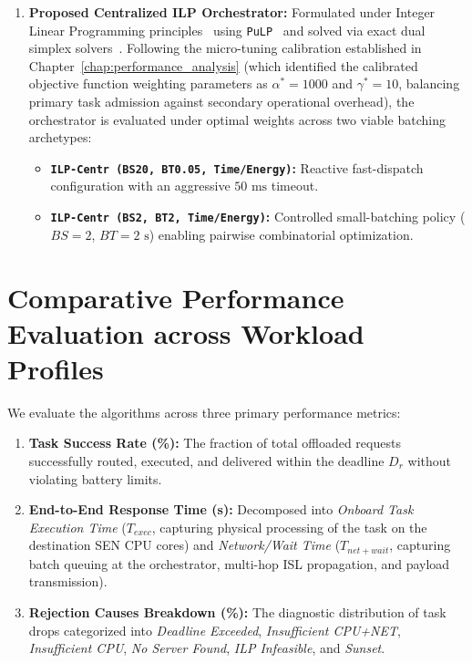 \begin{enumerate}
    \item \textbf{Proposed Centralized ILP Orchestrator:}
    Formulated under Integer Linear Programming principles~\cite{wolsey1998integer} using \texttt{PuLP}~\cite{pulp2011} and solved via exact dual simplex solvers~\cite{huangfu2018highs}. Following the micro-tuning calibration established in Chapter~\ref{chap:performance_analysis} (which identified the calibrated objective function weighting parameters as $\alpha^* = 1000$ and $\gamma^* = 10$, balancing primary task admission against secondary operational overhead), the orchestrator is evaluated under optimal weights across two viable batching archetypes:
    \begin{itemize}
        \item \textbf{\texttt{ILP-Centr (BS20, BT0.05, Time/Energy)}:} Reactive fast-dispatch configuration with an aggressive $50\text{ ms}$ timeout.
        \item \textbf{\texttt{ILP-Centr (BS2, BT2, Time/Energy)}:} Controlled small-batching policy ($BS=2$, $BT=2\text{ s}$) enabling pairwise combinatorial optimization.
    \end{itemize}
\end{enumerate}

\section{Comparative Performance Evaluation across Workload Profiles}
\label{sec:comparative_evaluation}

We evaluate the algorithms across three primary performance metrics:
\begin{enumerate}
    \item \textbf{Task Success Rate (\%):} The fraction of total offloaded requests successfully routed, executed, and delivered within the deadline $D_r$ without violating battery limits.
    \item \textbf{End-to-End Response Time (s):} Decomposed into \textit{Onboard Task Execution Time} ($T_{exec}$, capturing physical processing of the task on the destination SEN CPU cores) and \textit{Network/Wait Time} ($T_{net+wait}$, capturing batch queuing at the orchestrator, multi-hop ISL propagation, and payload transmission).
    \item \textbf{Rejection Causes Breakdown (\%):} The diagnostic distribution of task drops categorized into \textit{Deadline Exceeded}, \textit{Insufficient CPU+NET}, \textit{Insufficient CPU}, \textit{No Server Found}, \textit{ILP Infeasible}, and \textit{Sunset}.
\end{enumerate}

